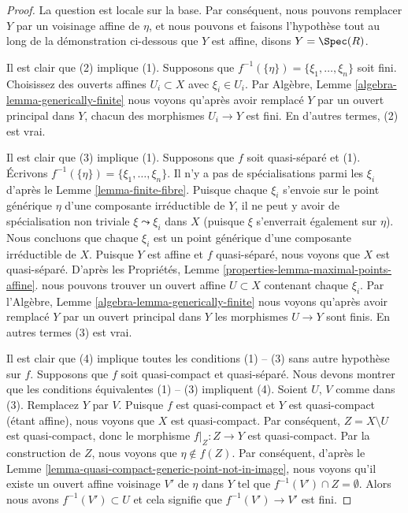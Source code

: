 \begin{proof}
La question est locale sur la base. Par conséquent, nous pouvons remplacer $Y$ par
un voisinage affine de $\eta$, et nous pouvons et faisons l'hypothèse tout au long de
la démonstration ci-dessous que $Y$ est affine, disons $Y = \Spec(R)$.

\medskip\noindent
Il est clair que (2) implique (1).
Supposons que $f^{-1}(\{\eta\}) = \{\xi_1, \ldots, \xi_n\}$ soit fini. Choisissez des ouverts affines
$U_i \subset X$ avec $\xi_i \in U_i$. Par Algèbre, Lemme \ref{algebra-lemma-generically-finite}
nous voyons qu'après avoir remplacé $Y$ par
un ouvert principal dans $Y$, chacun
des morphismes $U_i \to Y$ est fini. En d'autres
termes, (2) est vrai.

\medskip\noindent Il
est clair que (3) implique (1). Supposons que $f$ soit quasi-séparé et
(1). Écrivons $f^{-1}(\{\eta\}) = \{\xi_1, \ldots, \xi_n\}$. Il n'y a pas de spécialisations parmi les $\xi_i$
d'après le Lemme \ref{lemma-finite-fibre}. Puisque chaque $\xi_i$ s'envoie sur le
point générique $\eta$ d'une composante
irréductible de $Y$, il ne peut y avoir de spécialisation non triviale
$\xi \leadsto \xi_i$ dans $X$ (puisque $\xi$ s'enverrait
également sur $\eta$). Nous concluons
que chaque $\xi_i$ est un point générique d'une
composante irréductible de $X$.
Puisque $Y$ est affine et $f$ quasi-séparé, nous voyons que
$X$ est quasi-séparé. D'après les Propriétés, Lemme \ref{properties-lemma-maximal-points-affine}.
nous pouvons trouver un ouvert affine $U \subset X$ contenant chaque $\xi_i$.
Par l'Algèbre, Lemme \ref{algebra-lemma-generically-finite} nous voyons qu'après avoir remplacé
$Y$ par un ouvert principal dans $Y$
les morphismes $U \to Y$ sont finis. En
autres termes (3) est vrai.

\medskip\noindent Il
est clair que (4) implique toutes les conditions (1) -- (3) sans autre hypothèse
sur $f$. Supposons que $f$ soit quasi-compact et quasi-séparé. Nous
devons montrer que les conditions équivalentes (1) -- (3) impliquent
(4). Soient $U$, $V$ comme dans (3). Remplacez $Y$ par $V$.
Puisque $f$ est quasi-compact et $Y$ est quasi-compact (étant
affine), nous voyons que $X$ est quasi-compact. Par conséquent,
$Z = X \setminus U$ est quasi-compact, donc le morphisme $f|_Z : Z \to Y$ est quasi-compact.
Par la construction de $Z$,
nous voyons que $\eta \not \in f(Z)$. Par conséquent, d'après le Lemme
\ref{lemma-quasi-compact-generic-point-not-in-image}, nous voyons qu'il existe un
ouvert affine voisinage $V'$ de $\eta$ dans $Y$ tel que $f^{-1}(V') \cap Z = \emptyset$.
Alors nous avons $f^{-1}(V') \subset U$ et cela signifie
que $f^{-1}(V') \to V'$ est fini.
\end{proof}

